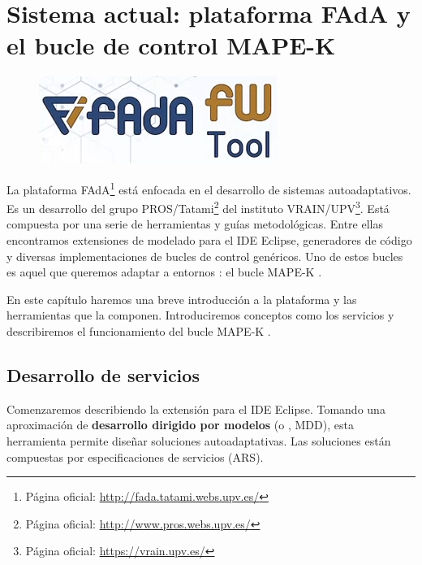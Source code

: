 \chapter{Sistema actual: plataforma FAdA y el bucle de control MAPE-K }
\label{chap:sistema_original}

\begin{figure}
  \vspace{5pt}
  \centering
  \includegraphics[scale=0.45]{cap_sistema_original/images/fada-logo}
  \vspace{2pt}
\end{figure}

La plataforma FAdA\footnote{Página oficial: \url{http://fada.tatami.webs.upv.es/}} está enfocada en el desarrollo de sistemas autoadaptativos. Es un desarrollo del grupo PROS/Tatami\footnote{Página oficial: \url{http://www.pros.webs.upv.es/}} del instituto VRAIN/UPV\footnote{Página oficial: \url{https://vrain.upv.es/}}. Está compuesta por una serie de herramientas y guías metodológicas. Entre ellas encontramos extensiones de modelado para el IDE Eclipse, generadores de código y diversas implementaciones de bucles de control genéricos. Uno de estos bucles es aquel que queremos adaptar a entornos : el bucle MAPE-K .

En este capítulo haremos una breve introducción a la plataforma y las herramientas que la componen. Introduciremos conceptos como los servicios  y describiremos el funcionamiento del bucle MAPE-K .

\section{Desarrollo de servicios }

Comenzaremos describiendo la extensión para el IDE Eclipse. Tomando una aproximación de \textbf{desarrollo dirigido por modelos} (o , MDD), esta herramienta permite diseñar soluciones autoadaptativas. Las soluciones están compuestas por especificaciones de servicios \textbf{} (ARS). \cite{fonsServiciosAdaptivereadyPara2021}

